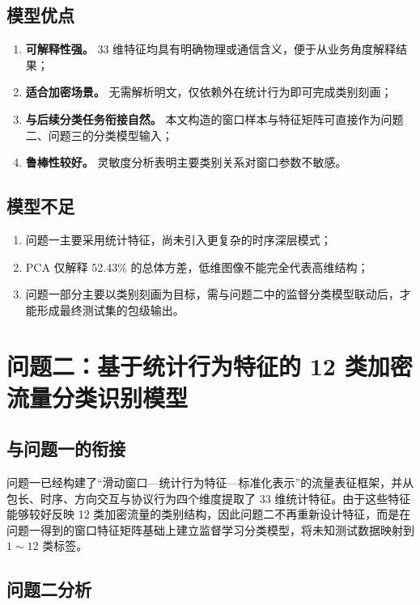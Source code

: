 \documentclass[UTF8,a4paper,12pt]{ctexart}
\begin{document}
\subsection{模型优点}
\begin{enumerate}[label=(\arabic*)]
    \item \textbf{可解释性强。} 33 维特征均具有明确物理或通信含义，便于从业务角度解释结果；
    \item \textbf{适合加密场景。} 无需解析明文，仅依赖外在统计行为即可完成类别刻画；
    \item \textbf{与后续分类任务衔接自然。} 本文构造的窗口样本与特征矩阵可直接作为问题二、问题三的分类模型输入；
    \item \textbf{鲁棒性较好。} 灵敏度分析表明主要类别关系对窗口参数不敏感。
\end{enumerate}

\subsection{模型不足}
\begin{enumerate}[label=(\arabic*)]
    \item 问题一主要采用统计特征，尚未引入更复杂的时序深层模式；
    \item PCA 仅解释 52.43\% 的总体方差，低维图像不能完全代表高维结构；
    \item 问题一部分主要以类别刻画为目标，需与问题二中的监督分类模型联动后，才能形成最终测试集的包级输出。
\end{enumerate}


\section{问题二：基于统计行为特征的 12 类加密流量分类识别模型}

\subsection{与问题一的衔接}

问题一已经构建了“滑动窗口—统计行为特征—标准化表示”的流量表征框架，并从包长、时序、方向交互与协议行为四个维度提取了 33 维统计特征。由于这些特征能够较好反映 12 类加密流量的类别结构，因此问题二不再重新设计特征，而是在问题一得到的窗口特征矩阵基础上建立监督学习分类模型，将未知测试数据映射到 $1\sim 12$ 类标签。

\subsection{问题二分析}
\end{document}
